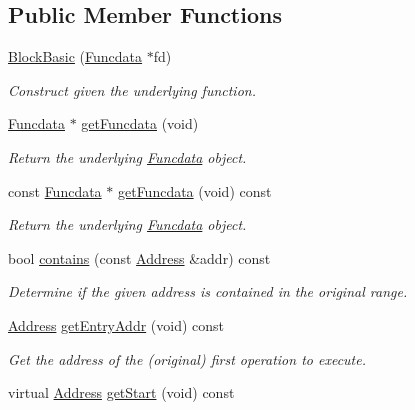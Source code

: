 \subsection*{Public Member Functions}
\begin{DoxyCompactItemize}
\item 
\mbox{\hyperlink{class_block_basic_a2e2866c010ac4530780a5ed3b9fbca92}{Block\+Basic}} (\mbox{\hyperlink{class_funcdata}{Funcdata}} $\ast$fd)
\begin{DoxyCompactList}\small\item\em Construct given the underlying function. \end{DoxyCompactList}\item 
\mbox{\hyperlink{class_funcdata}{Funcdata}} $\ast$ \mbox{\hyperlink{class_block_basic_ade69610ab83251b3b3cf8cc437612ce4}{get\+Funcdata}} (void)
\begin{DoxyCompactList}\small\item\em Return the underlying \mbox{\hyperlink{class_funcdata}{Funcdata}} object. \end{DoxyCompactList}\item 
const \mbox{\hyperlink{class_funcdata}{Funcdata}} $\ast$ \mbox{\hyperlink{class_block_basic_a57fb2cc818cabc999f97b377e356f779}{get\+Funcdata}} (void) const
\begin{DoxyCompactList}\small\item\em Return the underlying \mbox{\hyperlink{class_funcdata}{Funcdata}} object. \end{DoxyCompactList}\item 
bool \mbox{\hyperlink{class_block_basic_a68b76d2c45556951a5d975e5d3a235df}{contains}} (const \mbox{\hyperlink{class_address}{Address}} \&addr) const
\begin{DoxyCompactList}\small\item\em Determine if the given address is contained in the original range. \end{DoxyCompactList}\item 
\mbox{\hyperlink{class_address}{Address}} \mbox{\hyperlink{class_block_basic_aa77fad87efbfd970ca34b8fc71283be1}{get\+Entry\+Addr}} (void) const
\begin{DoxyCompactList}\small\item\em Get the address of the (original) first operation to execute. \end{DoxyCompactList}\item 
virtual \mbox{\hyperlink{class_address}{Address}} \mbox{\hyperlink{class_block_basic_a779d71352d86f6af4342b419713c03d5}{get\+Start}} (void) const

\end{DoxyCompactItemize}
